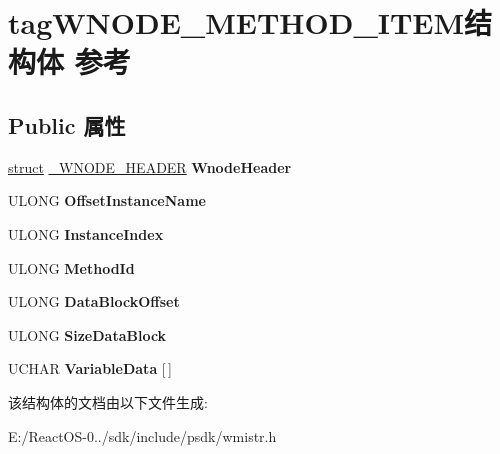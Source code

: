 \hypertarget{structtag_w_n_o_d_e___m_e_t_h_o_d___i_t_e_m}{}\section{tag\+W\+N\+O\+D\+E\+\_\+\+M\+E\+T\+H\+O\+D\+\_\+\+I\+T\+E\+M结构体 参考}
\label{structtag_w_n_o_d_e___m_e_t_h_o_d___i_t_e_m}
\subsection*{Public 属性}
\begin{DoxyCompactItemize}
\item 
\mbox{\label{structtag_w_n_o_d_e___m_e_t_h_o_d___i_t_e_m_a36f59c1bdebed31608b29961fef9ea48}} 
\hyperlink{interfacestruct}{struct} \hyperlink{struct___w_n_o_d_e___h_e_a_d_e_r}{\+\_\+\+W\+N\+O\+D\+E\+\_\+\+H\+E\+A\+D\+ER} {\bfseries Wnode\+Header}
\item 
\mbox{\label{structtag_w_n_o_d_e___m_e_t_h_o_d___i_t_e_m_a764a1700fe95a0af20be58aa5924d353}} 
U\+L\+O\+NG {\bfseries Offset\+Instance\+Name}
\item 
\mbox{\label{structtag_w_n_o_d_e___m_e_t_h_o_d___i_t_e_m_afdf4c25ab44ad09a9e6fb1f06908986f}} 
U\+L\+O\+NG {\bfseries Instance\+Index}
\item 
\mbox{\label{structtag_w_n_o_d_e___m_e_t_h_o_d___i_t_e_m_a2b9aa4f0a3bd5454f2a52693eb67de16}} 
U\+L\+O\+NG {\bfseries Method\+Id}
\item 
\mbox{\label{structtag_w_n_o_d_e___m_e_t_h_o_d___i_t_e_m_a61a1dc7e5e1009a7b27bd48d5795e22b}} 
U\+L\+O\+NG {\bfseries Data\+Block\+Offset}
\item 
\mbox{\label{structtag_w_n_o_d_e___m_e_t_h_o_d___i_t_e_m_a8a473fc7f6742efb374279775590ee8c}} 
U\+L\+O\+NG {\bfseries Size\+Data\+Block}
\item 
\mbox{\label{structtag_w_n_o_d_e___m_e_t_h_o_d___i_t_e_m_a02609d5bc5adfaa5a36795e72dd6594d}} 
U\+C\+H\+AR {\bfseries Variable\+Data} \mbox{[}$\,$\mbox{]}
\end{DoxyCompactItemize}


该结构体的文档由以下文件生成\+:\begin{DoxyCompactItemize}
\item 
E\+:/\+React\+O\+S-\/0../sdk/include/psdk/wmistr.\+h\end{DoxyCompactItemize}
